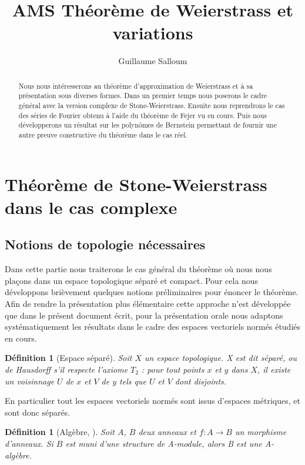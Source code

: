 \documentclass{amsart}
\title{AMS Théorème de Weierstrass et variations}
\author{Guillaume Salloum}
\newtheorem{definition}[subsubsection]{Définition}
\begin{document}
\begin{abstract}
	Nous nous intéresserons au théorème d'approximation de Weierstrass et
	à sa présentation sous diverses formes. Dans un premier temps nous poserons le cadre
	général avec la version complexe de Stone-Weierstrass.
	Ensuite nous reprendrons le cas
	des séries de Fourier obtenu à l'aide du théorème de Fejer vu en cours. 
	Puis nous développerons un résultat sur les polynômes de Bernstein permettant
	de fournir une autre preuve constructive du théorème dans le cas réel.
\end{abstract}

\maketitle
\setcounter{tocdepth}{2}
\tableofcontents

\section{Théorème de Stone-Weierstrass dans le cas complexe}
\subsection{Notions de topologie nécessaires}

\par Dans cette partie nous traiterons le cas général du théorème où nous nous plaçons dans 
un espace topologique séparé et compact. Pour cela nous développons brièvement quelques notions préliminaires pour énoncer le théorème.
Afin de rendre la présentation plus élémentaire cette approche n'est développée que dans le présent document écrit, pour la présentation orale nous adaptons systématiquement les résultats dans le cadre des espaces vectoriels normés étudiés en cours.

\begin{definition}[Espace séparé]
	Soit \( X \) un espace topologique. X est dit \textit{séparé}, ou \textit{de Hausdorff} s'il respecte l'axiome \( T_{2} \) : pour tout points \( x \) et \( y \) dans \( X \), il existe un voisinnage \( U \) de \( x \) et \( V \) de \( y \) tels que \( U \) et \( V \) dont disjoints.
\end{definition}

En particulier tout les espaces vectoriels normés sont issus d'espaces métriques, et sont donc séparés.

\begin{definition}[Algèbre, \cite{atiyah1969introduction}]
	Soit \( A \), \( B \) deux anneaux et \( f : A \rightarrow B \) 
	un morphisme d'anneaux. Si \( B \) est muni d'une structure de \textit{A-module}, alors B est une \textit{A-algèbre}.
\end{definition}
\end{document}
